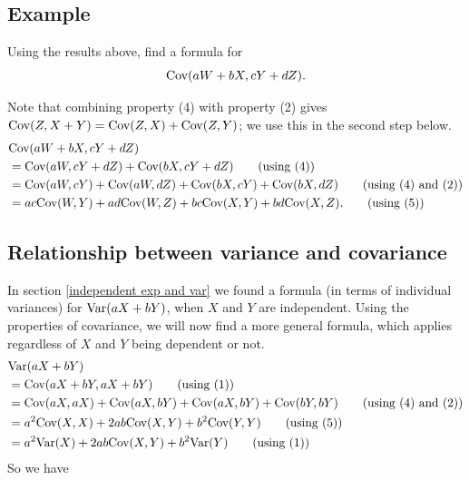 \subsection{Example}
Using the results above, find a formula for
\[
\text{Cov}(aW + bX, cY + dZ).
\]

\solution
Note that combining property (4) with property (2) gives $\text{Cov}(Z,X + Y) = \text{Cov}(Z,X) + \text{Cov}(Z,Y)$; we use this in the second step below.
\begin{align*}
& \text{Cov}(aW + bX, cY + dZ)  \\
& = \text{Cov}(aW,cY + dZ) + \text{Cov}(bX,cY + dZ) \tag{using (4)}\\
	& = \text{Cov}(aW,cY) + \text{Cov}(aW,dZ) + \text{Cov}(bX,cY) + \text{Cov}(bX,dZ) \tag{using (4) and (2)} \\
	& = ac\text{Cov}(W,Y) + ad\text{Cov}(W,Z) + bc\text{Cov}(X,Y) + bd\text{Cov}(X,Z). \tag{using (5)}
\end{align*}

\subsection{Relationship between variance and covariance} \label{variance covariance formula}
In section \ref{independent exp and var} we found a formula (in terms of individual variances) for $\text{Var}(aX + bY)$, when $X$ and $Y$ are independent. Using the properties of covariance, we will now find a more general formula, which  applies regardless of $X$ and $Y$ being dependent or not.
\begin{align*}
	& \text{Var}(aX + bY)\\ 
	 & = \text{Cov}(aX + bY, aX + bY) \tag{using (1)} \\
	& = \text{Cov}(aX,aX) + \text{Cov}(aX,bY) + \text{Cov}(aX,bY) + \text{Cov}(bY,bY) \tag{using (4) and (2)} \\
	& = a^2\text{Cov}(X,X) + 2ab\text{Cov}(X,Y) + b^2\text{Cov}(Y,Y) \tag{using (5)} \\
	& = a^2\text{Var}(X) + 2ab\text{Cov}(X,Y) + b^2\text{Var}(Y) \tag{using (1)}
\end{align*}
So we have

  	\bigskip
	
	\hfil{}
	\bigskip
	
